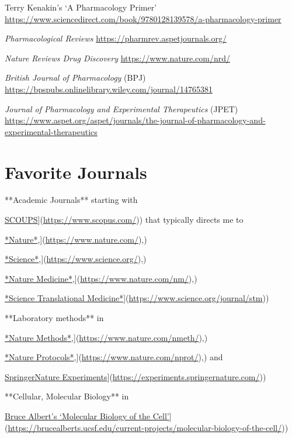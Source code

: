 \documentclass[
]{book}
\begin{document}
Terry Kenakin's `A Pharmacology Primer' \url{https://www.sciencedirect.com/book/9780128139578/a-pharmacology-primer}

\emph{Pharmacological Reviews} \url{https://pharmrev.aspetjournals.org/}

\emph{Nature Reviews Drug Discovery} \url{https://www.nature.com/nrd/}

\emph{British Journal of Pharmacology} (BPJ) \url{https://bpspubs.onlinelibrary.wiley.com/journal/14765381}

\emph{Journal of Pharmacology and Experimental Therapeutics} (JPET) \url{https://www.aspet.org/aspet/journals/the-journal-of-pharmacology-and-experimental-therapeutics}

\chapter{Favorite Journals}\label{favorite-journals}

**Academic Journals** starting with

\href{\%5Bhttps://www.scopus.com/}{SCOUPS}{]}(\url{https://www.scopus.com/})) that typically directs me to

\href{\%5Bhttps://www.nature.com/}{*Nature*},{]}(\url{https://www.nature.com/}),)

\href{\%5Bhttps://www.science.org/}{*Science*},{]}(\url{https://www.science.org/}),)

\href{\%5Bhttps://www.nature.com/nm/}{*Nature Medicine*},{]}(\url{https://www.nature.com/nm/}),)

\href{\%5Bhttps://www.science.org/journal/stm}{*Science Translational Medicine*}{]}(\url{https://www.science.org/journal/stm}))

**Laboratory methods** in

\href{\%5Bhttps://www.nature.com/nmeth/}{*Nature Methods*},{]}(\url{https://www.nature.com/nmeth/}),)

\href{\%5Bhttps://www.nature.com/nprot/}{*Nature Protocols*},{]}(\url{https://www.nature.com/nprot/}),) and

\href{\%5Bhttps://experiments.springernature.com/}{Springer\textbar Nature Experiments}{]}(\url{https://experiments.springernature.com/}))

**Cellular, Molecular Biology** in

\href{\%5Bhttps://brucealberts.ucsf.edu/current-projects/molecular-biology-of-the-cell/}{Bruce Albert's `Molecular Biology of the Cell'}{]}(\url{https://brucealberts.ucsf.edu/current-projects/molecular-biology-of-the-cell/}))
\end{document}
